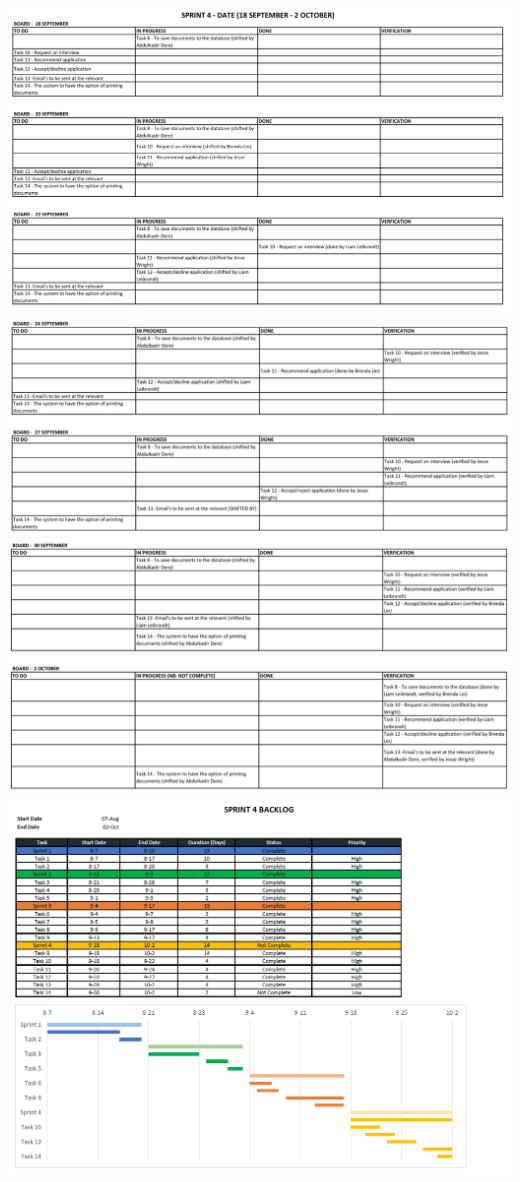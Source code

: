 \documentclass{article}
\begin{document}
\includegraphics[scale=0.5]{Sprint4a.png}\\
\includegraphics[scale=0.5]{Sprint4b.png}\\
\includegraphics[scale=0.5]{Sprint4c.png}\\
\includegraphics[scale=0.65]{Sprint4Backlog.PNG}\\
\end{document}
